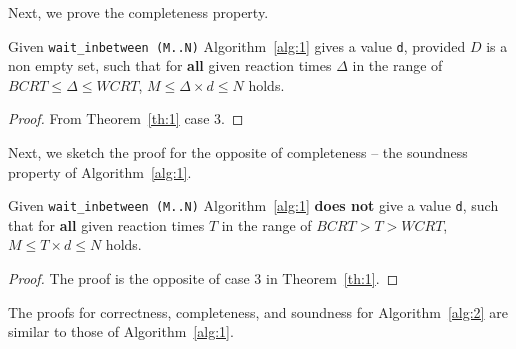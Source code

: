Next, we prove the completeness property.
\begin{theorem}
  Given \texttt{wait\_inbetween (M..N)} Algorithm~\ref{alg:1} gives a
  value \texttt{d}, provided $D$ is a non empty set, such that for
  \textbf{all} given reaction times $\Delta$ in the range of $BCRT \leq
  \Delta \leq WCRT$, $M \leq \Delta \times d \leq N$ holds.
\end{theorem}
\begin{proof}
  From Theorem~\ref{th:1} case 3.
\end{proof}

Next, we sketch the proof for the opposite of completeness -- the
soundness property of Algorithm~\ref{alg:1}.

\begin{theorem}
  Given \texttt{wait\_inbetween (M..N)} Algorithm~\ref{alg:1}
  \textbf{does not} give a value \texttt{d}, such that for \textbf{all}
  given reaction times $T$ in the range of $BCRT > T > WCRT$, $M \leq T
  \times d \leq N$ holds.
\end{theorem}

\begin{proof}
  The proof is the opposite of case 3 in Theorem~\ref{th:1}.
\end{proof}

The proofs for correctness, completeness, and soundness for
Algorithm~\ref{alg:2} are similar to those of Algorithm~\ref{alg:1}.

